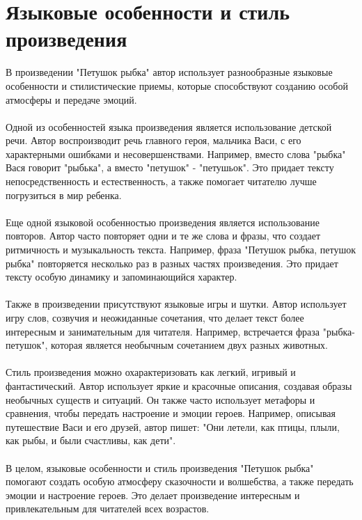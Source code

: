 \documentclass{article}
\begin{document}
\section{Языковые особенности и стиль произведения}
В произведении "{}Петушок рыбка"{} автор использует разнообразные языковые особенности и стилистические приемы, которые способствуют созданию особой атмосферы и передаче эмоций.\\
~\\
Одной из особенностей языка произведения является использование детской речи. Автор воспроизводит речь главного героя, мальчика Васи, с его характерными ошибками и несовершенствами. Например, вместо слова "{}рыбка"{} Вася говорит "{}рыбька"{}, а вместо "{}петушок"{} - "{}петушьок"{}. Это придает тексту непосредственность и естественность, а также помогает читателю лучше погрузиться в мир ребенка.\\
~\\
Еще одной языковой особенностью произведения является использование повторов. Автор часто повторяет одни и те же слова и фразы, что создает ритмичность и музыкальность текста. Например, фраза "{}Петушок рыбка, петушок рыбка"{} повторяется несколько раз в разных частях произведения. Это придает тексту особую динамику и запоминающийся характер.\\
~\\
Также в произведении присутствуют языковые игры и шутки. Автор использует игру слов, созвучия и неожиданные сочетания, что делает текст более интересным и занимательным для читателя. Например, встречается фраза "{}рыбка-петушок"{}, которая является необычным сочетанием двух разных животных.\\
~\\
Стиль произведения можно охарактеризовать как легкий, игривый и фантастический. Автор использует яркие и красочные описания, создавая образы необычных существ и ситуаций. Он также часто использует метафоры и сравнения, чтобы передать настроение и эмоции героев. Например, описывая путешествие Васи и его друзей, автор пишет: "{}Они летели, как птицы, плыли, как рыбы, и были счастливы, как дети"{}.\\
~\\
В целом, языковые особенности и стиль произведения "{}Петушок рыбка"{} помогают создать особую атмосферу сказочности и волшебства, а также передать эмоции и настроение героев. Это делает произведение интересным и привлекательным для читателей всех возрастов.
\end{document}
